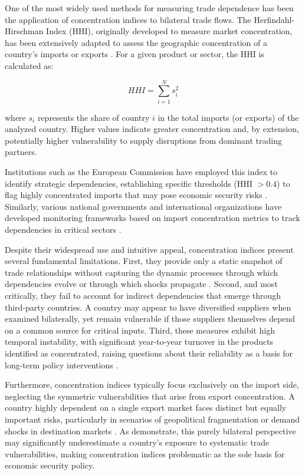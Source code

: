 \documentclass[final,1p,times,authoryear]{elsarticle}
\begin{document}
One of the most widely used methods for measuring trade dependence has been the application of concentration indices to bilateral trade flows. The Herfindahl-Hirschman Index (HHI), originally developed to measure market concentration, has been extensively adapted to assess the geographic concentration of a country's imports or exports \citep{Michaely1962, Balassa1965}. For a given product or sector, the HHI is calculated as:

\begin{equation}
HHI = \sum_{i=1}^{N} s_i^2
\end{equation}

where $s_i$ represents the share of country $i$ in the total imports (or exports) of the analyzed country. Higher values indicate greater concentration and, by extension, potentially higher vulnerability to supply disruptions from dominant trading partners.

Institutions such as the European Commission have employed this index to identify strategic dependencies, establishing specific thresholds (HHI $> 0.4$) to flag highly concentrated imports that may pose economic security risks \citep{EuropeanCommission2021, Arjona2023}. Similarly, various national governments and international organizations have developed monitoring frameworks based on import concentration metrics to track dependencies in critical sectors \citep{Bonneau2020, Jean2023}.

Despite their widespread use and intuitive appeal, concentration indices present several fundamental limitations. First, they provide only a static snapshot of trade relationships without capturing the dynamic processes through which dependencies evolve or through which shocks propagate \citep{Cadot2014}. Second, and most critically, they fail to account for indirect dependencies that emerge through third-party countries. A country may appear to have diversified suppliers when examined bilaterally, yet remain vulnerable if those suppliers themselves depend on a common source for critical inputs. Third, these measures exhibit high temporal instability, with significant year-to-year turnover in the products identified as concentrated, raising questions about their reliability as a basis for long-term policy interventions \citep{Vicard2023}.

Furthermore, concentration indices typically focus exclusively on the import side, neglecting the symmetric vulnerabilities that arise from export concentration. A country highly dependent on a single export market faces distinct but equally important risks, particularly in scenarios of geopolitical fragmentation or demand shocks in destination markets \citep{Balteanu2025}. As \cite{Vicard2023} demonstrate, this purely bilateral perspective may significantly underestimate a country's exposure to systematic trade vulnerabilities, making concentration indices problematic as the sole basis for economic security policy.
\end{document}
